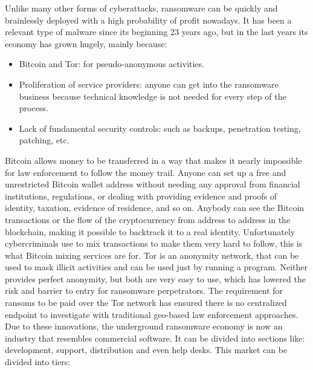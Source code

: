 \linej
Unlike many other forms of cyberattacks, ransomware can be quickly and brainlessly deployed with a high probability of profit nowadays.
It has been a relevant type of malware since its beginning 23 years ago, but in the last years its economy has grown hugely, mainly because\cite{ransomware_digital_extortion}\cite{ransomware_economy}:
\begin{itemize}
	\item Bitcoin and Tor: for pseudo-anonymous activities.
	\item Proliferation of service providers: anyone can get into the ransomware business because technical knowledge is not needed for every step of the process.
	\item Lack of fundamental security controls: such as backups, penetration testing, patching, etc.
\end{itemize}
\linej
Bitcoin allows money to be transferred in a way that makes it nearly impossible for law enforcement to follow the money trail.
Anyone can set up a free and unrestricted Bitcoin wallet address without needing any approval from financial institutions, regulations, or dealing with providing evidence and proofs of identity, taxation, evidence of residence, and so on.
Anybody can see the Bitcoin transactions or the flow of the cryptocurrency from address to address in the blockchain, making it possible to backtrack it to a real identity.
Unfortunately cybercriminals use to mix transactions to make them very hard to follow, this is what Bitcoin mixing services are for.
\linej
Tor is an anonymity network, that can be used to mask illicit activities and can be used just by running a program.
\linej
Neither provides perfect anonymity, but both are very easy to use, which has lowered the risk and barrier to entry for ransomware perpetrators.
The requirement for ransoms to be paid over the Tor network has ensured there is no centralized endpoint to investigate with traditional geo-based law enforcement approaches\cite{ransomware_digital_extortion}.
\linej
\linej
Due to these innovations, the underground ransomware economy is now an industry that resembles commercial software. It can be divided into sections like: development, support, distribution and even help desks. This market can be divided into tiers\cite{ransomware_economy}:
